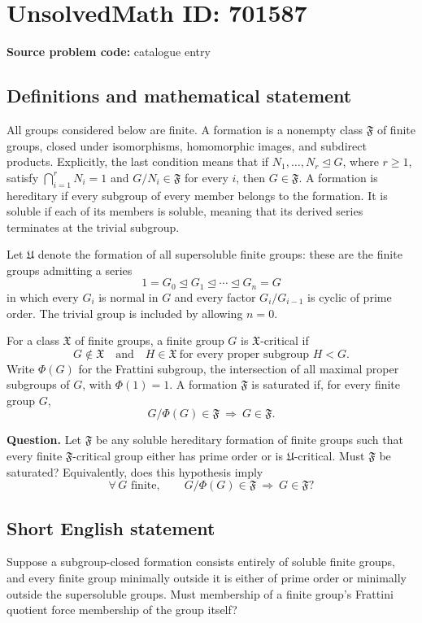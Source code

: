 \documentclass[11pt]{article}
\begin{document}
\section*{UnsolvedMath ID: 701587}
\textbf{Source problem code:} catalogue entry
\subsection{Definitions and mathematical statement}
All groups considered below are finite. A formation is a nonempty class \(\mathfrak F\) of finite groups, closed under isomorphisms, homomorphic images, and subdirect products. Explicitly, the last condition means that if \(N_1,\ldots,N_r\trianglelefteq G\), where \(r\geq 1\), satisfy \(\bigcap_{i=1}^r N_i=1\) and \(G/N_i\in\mathfrak F\) for every \(i\), then \(G\in\mathfrak F\). A formation is hereditary if every subgroup of every member belongs to the formation. It is soluble if each of its members is soluble, meaning that its derived series terminates at the trivial subgroup.

Let \(\mathfrak U\) denote the formation of all supersoluble finite groups: these are the finite groups admitting a series
\[
1=G_0\trianglelefteq G_1\trianglelefteq\cdots\trianglelefteq G_n=G
\]
in which every \(G_i\) is normal in \(G\) and every factor \(G_i/G_{i-1}\) is cyclic of prime order. The trivial group is included by allowing \(n=0\).

For a class \(\mathfrak X\) of finite groups, a finite group \(G\) is \(\mathfrak X\)-critical if
\[
G\notin\mathfrak X
\quad\text{and}\quad
H\in\mathfrak X\ \text{for every proper subgroup }H<G.
\]
Write \(\Phi(G)\) for the Frattini subgroup, the intersection of all maximal proper subgroups of \(G\), with \(\Phi(1)=1\). A formation \(\mathfrak F\) is saturated if, for every finite group \(G\),
\[
G/\Phi(G)\in\mathfrak F\ \Longrightarrow\ G\in\mathfrak F.
\]

\textbf{Question.} Let \(\mathfrak F\) be any soluble hereditary formation of finite groups such that every finite \(\mathfrak F\)-critical group either has prime order or is \(\mathfrak U\)-critical. Must \(\mathfrak F\) be saturated? Equivalently, does this hypothesis imply
\[
\forall\,G\text{ finite},\qquad
G/\Phi(G)\in\mathfrak F\ \Longrightarrow\ G\in\mathfrak F?
\]
\subsection{Short English statement}
Suppose a subgroup-closed formation consists entirely of soluble finite groups, and every finite group minimally outside it is either of prime order or minimally outside the supersoluble groups. Must membership of a finite group's Frattini quotient force membership of the group itself?
\end{document}
